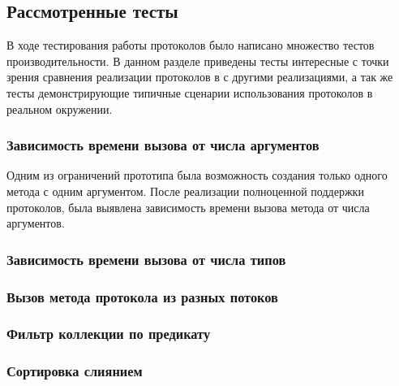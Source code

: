 \subsection{Рассмотренные тесты}
В ходе тестирования работы протоколов было написано множество тестов производительности. В данном разделе приведены тесты интересные с точки зрения сравнения реализации протоколов в  с другими реализациями, а так же тесты демонстрирующие типичные сценарии использования протоколов в реальном окружении.

\subsubsection{Зависимость времени вызова от числа аргументов}
Одним из ограничений прототипа была возможность создания только одного метода с одним аргументом. После реализации полноценной поддержки протоколов, была выявлена зависимость времени вызова метода от числа аргументов.

\subsubsection{Зависимость времени вызова от числа типов}

\subsubsection{Вызов метода протокола из разных потоков}

\subsubsection{Фильтр коллекции по предикату}

\subsubsection{Сортировка слиянием}
